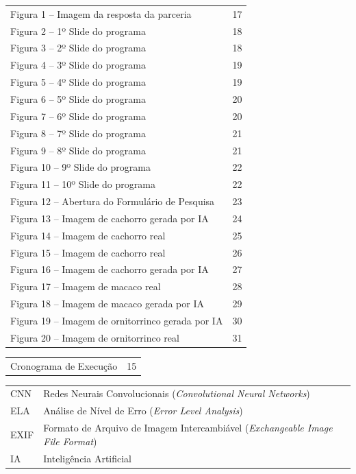 \newpage
{}
\singlespacing
\begin{longtable}{@{}p{12cm}r@{}}
Figura 1 -- Imagem da resposta da parceria & 17\\
Figura 2 -- 1º Slide do programa & 18\\
Figura 3 -- 2º Slide do programa & 18\\
Figura 4 -- 3º Slide do programa & 19\\
Figura 5 -- 4º Slide do programa & 19\\
Figura 6 -- 5º Slide do programa & 20\\
Figura 7 -- 6º Slide do programa & 20\\
Figura 8 -- 7º Slide do programa & 21\\
Figura 9 -- 8º Slide do programa & 21\\
Figura 10 -- 9º Slide do programa & 22\\
Figura 11 -- 10º Slide do programa & 22\\
Figura 12 -- Abertura do Formulário de Pesquisa & 23\\
Figura 13 -- Imagem de cachorro gerada por IA & 24\\
Figura 14 -- Imagem de cachorro real & 25\\
Figura 15 -- Imagem de cachorro real & 26\\
Figura 16 -- Imagem de cachorro gerada por IA & 27\\
Figura 17 -- Imagem de macaco real & 28\\
Figura 18 -- Imagem de macaco gerada por IA & 29\\
Figura 19 -- Imagem de ornitorrinco gerada por IA & 30\\
Figura 20 -- Imagem de ornitorrinco real & 31\\
\end{longtable}

\vspace{6mm}
\begin{longtable}{@{}p{12cm}r@{}}
Cronograma de Execução & 15\\
\end{longtable}

\vspace{6mm}
\begin{longtable}{@{}p{2cm}p{11cm}@{}}
CNN  & Redes Neurais Convolucionais (\textit{Convolutional Neural Networks})\\
ELA  & Análise de Nível de Erro (\textit{Error Level Analysis})\\
EXIF & Formato de Arquivo de Imagem Intercambiável (\textit{Exchangeable Image
       File Format})\\
IA   & Inteligência Artificial\\
\end{longtable}
\onehalfspacing

\newpage
\renewcommand{\contentsname}{Sumário}
\tableofcontents

